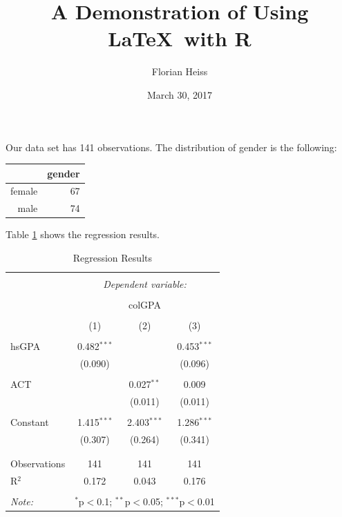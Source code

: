 \documentclass[fontsize=12pt,DIV=30]{scrartcl}\usepackage[]{graphicx}\usepackage[]{color}
\begin{document}
\title{A Demonstration of Using \LaTeX\ with R}
\author{Florian Heiss}
\date{March 30, 2017}
\maketitle
\thispagestyle{empty}



Our data set has 141 observations. 
The distribution of gender is the following:
\begin{table}[ht]
\centering
\begin{tabular}{rr}
  \hline
 & gender \\ 
  \hline
female &  67 \\ 
  male &  74 \\ 
   \hline
\end{tabular}
\end{table}


Table \ref{t:reg} shows the regression results. 

\begin{table}[!htbp] \centering 
  \caption{Regression Results} 
  \label{t:reg} 
\begin{tabular}{@{\extracolsep{5pt}}lccc} 
\\[-1.8ex]\hline 
\hline \\[-1.8ex] 
 & \multicolumn{3}{c}{\textit{Dependent variable:}} \\ 
\cline{2-4} 
\\[-1.8ex] & \multicolumn{3}{c}{colGPA} \\ 
\\[-1.8ex] & (1) & (2) & (3)\\ 
\hline \\[-1.8ex] 
 hsGPA & 0.482$^{***}$ &  & 0.453$^{***}$ \\ 
  & (0.090) &  & (0.096) \\ 
  & & & \\ 
 ACT &  & 0.027$^{**}$ & 0.009 \\ 
  &  & (0.011) & (0.011) \\ 
  & & & \\ 
 Constant & 1.415$^{***}$ & 2.403$^{***}$ & 1.286$^{***}$ \\ 
  & (0.307) & (0.264) & (0.341) \\ 
  & & & \\ 
\hline \\[-1.8ex] 
Observations & 141 & 141 & 141 \\ 
R$^{2}$ & 0.172 & 0.043 & 0.176 \\ 
\hline 
\hline \\[-1.8ex] 
\textit{Note:}  & \multicolumn{3}{r}{$^{*}$p$<$0.1; $^{**}$p$<$0.05; $^{***}$p$<$0.01} \\ 
\end{tabular} 
\end{table} 
\end{document}
